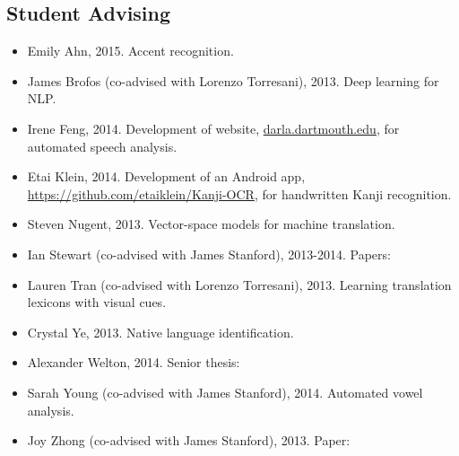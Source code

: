 \documentclass[10.5pt,letterpaper]{article}
\begin{document}
\subsection*{Student Advising}

\begin{itemize}
\item Emily Ahn, 2015. Accent recognition.
\item James Brofos (co-advised with Lorenzo Torresani), 2013. Deep learning for NLP.
\item Irene Feng, 2014. Development of website, \url{darla.dartmouth.edu}, for automated speech analysis.
\item Etai Klein, 2014. Development of an Android app, \url{https://github.com/etaiklein/Kanji-OCR}, for handwritten Kanji recognition.
\item Steven Nugent, 2013. Vector-space models for machine translation.
\item Ian Stewart (co-advised with James Stanford), 2013-2014. Papers:


\item Lauren Tran (co-advised with Lorenzo Torresani), 2013. Learning translation lexicons with visual cues.

\item Crystal Ye, 2013. Native language identification.
\item Alexander Welton, 2014. Senior thesis:


\item Sarah Young (co-advised with James Stanford), 2014. Automated vowel analysis.
\item Joy Zhong (co-advised with James Stanford), 2013. Paper:

\end{itemize}
\end{document}
